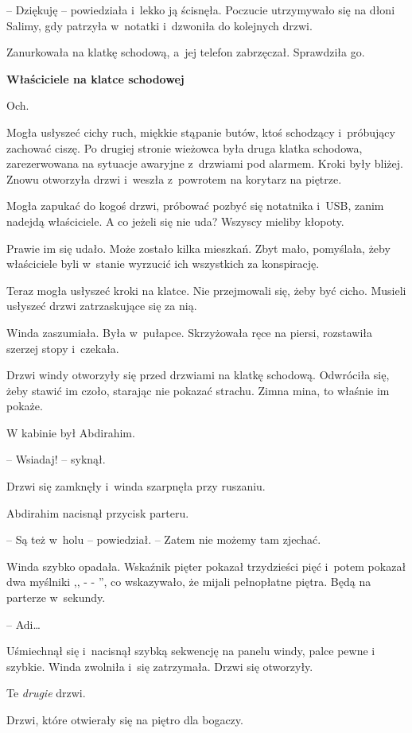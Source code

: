 \documentclass[oneside,polish,11pt,sfheadings]{mwbk}
\begin{document}
-- Dziękuję -- powiedziała i~lekko ją ścisnęła. Poczucie utrzymywało się
na dłoni Salimy, gdy patrzyła w~notatki i~dzwoniła do kolejnych drzwi.

Zanurkowała na klatkę schodową, a~jej telefon zabrzęczał. Sprawdziła go.

\textbf{ Właściciele na klatce schodowej}

Och.

Mogła usłyszeć cichy ruch, miękkie stąpanie butów, ktoś schodzący i~próbujący zachować ciszę. Po drugiej stronie wieżowca była druga klatka
schodowa, zarezerwowana na sytuacje awaryjne z~drzwiami pod alarmem.
Kroki były bliżej. Znowu otworzyła drzwi i~weszła z~powrotem na korytarz
na piętrze.

Mogła zapukać do kogoś drzwi, próbować pozbyć się notatnika i~USB, zanim
nadejdą właściciele. A co jeżeli się nie uda? Wszyscy mieliby kłopoty.

Prawie im się udało. Może zostało kilka mieszkań. Zbyt mało, pomyślała,
żeby właściciele byli w~stanie wyrzucić ich wszystkich za konspirację.

Teraz mogła usłyszeć kroki na klatce. Nie przejmowali się, żeby być
cicho. Musieli usłyszeć drzwi zatrzaskujące się za nią.

Winda zaszumiała. Była w~pułapce. Skrzyżowała ręce na piersi, rozstawiła
szerzej stopy i~czekała.

Drzwi windy otworzyły się przed drzwiami na klatkę schodową. Odwróciła
się, żeby stawić im czoło, starając nie pokazać strachu. Zimna mina, to
właśnie im pokaże.

W kabinie był Abdirahim.

-- Wsiadaj! -- syknął.

Drzwi się zamknęły i~winda szarpnęła przy ruszaniu.

Abdirahim nacisnął przycisk parteru. 

-- Są też w~holu -- powiedział. -- Zatem nie możemy tam zjechać.

Winda szybko opadała. Wskaźnik pięter pokazał trzydzieści pięć i~potem
pokazał dwa myślniki ,, - - '', co wskazywało, że mijali pełnopłatne
piętra. Będą na parterze w~sekundy.

-- Adi\ldots 

Uśmiechnął się i~nacisnął szybką sekwencję na panelu windy, palce pewne
i szybkie. Winda zwolniła i~się zatrzymała. Drzwi się otworzyły.

Te \textit{drugie} drzwi.

Drzwi, które otwierały się na piętro dla bogaczy.
\end{document}
